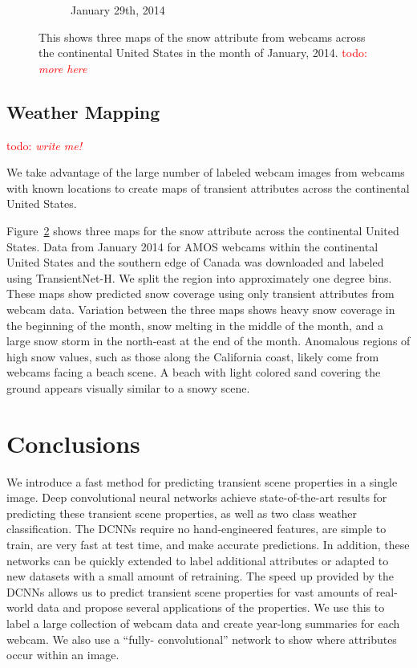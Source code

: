 \documentclass[10pt,twocolumn,letterpaper]{article}
\newcommand{\todo}[1]{\textcolor{red}{todo: {\em #1}}}
\newcommand{\figref}[1]{Figure~\ref{fig:#1}}
\begin{document}
\begin{figure}
\begin{subfigure}[b]{0.3\textwidth}
    \caption{January 29th, 2014}
    \label{fig:snow_map_3}
  \end{subfigure}
  \caption{This shows three maps of the snow attribute from webcams across the
           continental United States in the month of January, 2014. 
           \todo{more here}}
  \label{fig:snow_maps}
\end{figure}

\subsection{Weather Mapping}

\todo{write me!}

We take advantage of the large number of labeled webcam images from webcams
with known locations to create maps of transient attributes across the 
continental United States.

\figref{snow_maps} shows three maps for the snow attribute across the
continental United States.  Data from January 2014 for AMOS webcams within the
continental United States and the southern edge of Canada was downloaded and
labeled using TransientNet-H.  We split the region into approximately one
degree bins.  These maps show predicted snow coverage using only transient
attributes from webcam data.  Variation between the three maps shows heavy snow
coverage in the beginning of the month, snow melting in the middle of the
month, and a large snow storm in the north-east at the end of the month.
Anomalous regions of high snow values, such as those along the California
coast, likely come from webcams facing a beach scene.  A beach with light
colored sand covering the ground appears visually similar to a snowy scene.

\section{Conclusions}
We introduce a fast method for predicting transient scene properties in a
single image.  Deep convolutional neural networks achieve state-of-the-art
results for predicting these transient scene properties, as well as two class
weather classification.  The DCNNs require no hand-engineered features, are
simple to train, are very fast at test time, and make accurate predictions. In
addition, these networks can be quickly extended to label additional attributes
or adapted to new datasets with a small amount of retraining.  The speed up
provided by the DCNNs allows us to predict transient scene properties for vast
amounts of real-world data and propose several applications of the properties.
We use this to label a large collection of webcam data and create year-long
summaries for each webcam.  We also use a ``fully- convolutional'' network to
show where attributes occur within an image.
\end{document}
